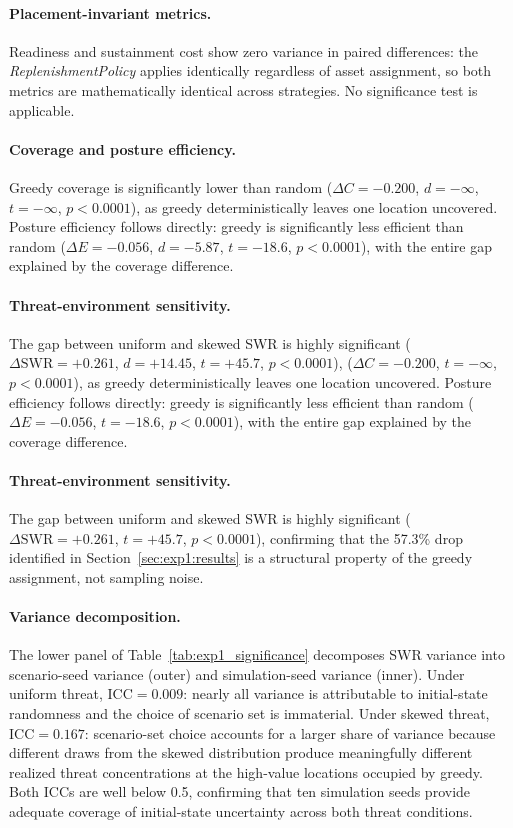 \documentclass[11pt]{article}
\begin{document}
\paragraph{Placement-invariant metrics.}
Readiness and sustainment cost show zero variance in paired differences:
the \emph{ReplenishmentPolicy} applies identically regardless of asset
assignment, so both metrics are mathematically identical across strategies.
No significance test is applicable.

\paragraph{Coverage and posture efficiency.}
Greedy coverage is significantly lower than random
($\Delta C = -0.200$, $d = -\infty$, $t = -\infty$, $p < 0.0001$),
as greedy deterministically leaves one location uncovered.
Posture efficiency follows directly: greedy is significantly less efficient
than random ($\Delta E = -0.056$, $d = -5.87$, $t = -18.6$,
$p < 0.0001$), with the entire gap explained by the coverage difference.

\paragraph{Threat-environment sensitivity.}
The gap between uniform and skewed SWR is highly significant
($\Delta\mathrm{SWR} = +0.261$, $d = +14.45$, $t = +45.7$,
$p < 0.0001$),
($\Delta C = -0.200$, $t = -\infty$, $p < 0.0001$),
as greedy deterministically leaves one location uncovered.
Posture efficiency follows directly: greedy is significantly less efficient
than random ($\Delta E = -0.056$, $t = -18.6$, $p < 0.0001$),
with the entire gap explained by the coverage difference.

\paragraph{Threat-environment sensitivity.}
The gap between uniform and skewed SWR is highly significant
($\Delta\mathrm{SWR} = +0.261$, $t = +45.7$, $p < 0.0001$),
confirming that the 57.3\% drop identified in
Section~\ref{sec:exp1:results} is a structural property of the
greedy assignment, not sampling noise.

\paragraph{Variance decomposition.}
The lower panel of Table~\ref{tab:exp1_significance} decomposes SWR
variance into scenario-seed variance (outer) and simulation-seed variance
(inner). Under uniform threat, $\mathrm{ICC} = 0.009$: nearly all
variance is attributable to initial-state randomness and the choice of
scenario set is immaterial. Under skewed threat, $\mathrm{ICC} = 0.167$:
scenario-set choice accounts for a larger share of variance because
different draws from the skewed distribution produce meaningfully
different realized threat concentrations at the high-value locations
occupied by greedy. Both ICCs are well below 0.5, confirming that
ten simulation seeds provide adequate coverage of initial-state
uncertainty across both threat conditions.






\newpage


\end{document}
